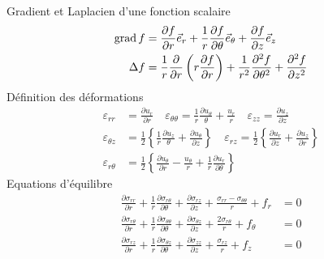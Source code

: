 Gradient et Laplacien d'une fonction scalaire
\begin{align*}
    \operatorname*{\mathrm{grad}} f &= \frac{\partial f}{\partial r} \vec{e}_r + \frac{1}{r} \frac{\partial f}{\partial \theta} \vec{e}_{\theta} + \frac{\partial f}{\partial z} \vec{e}_z \\
    \Delta f &= \frac{1}{r} \frac{\partial}{\partial r} \left( r \frac{\partial f}{\partial r} \right) + \frac{1}{r^{2}}\frac{\partial^2 f}{\partial \theta^2} + \frac{\partial^2 f}{\partial z^2}
\end{align*}
Définition des déformations
\begin{align*}
    \varepsilon_{rr} &= \frac{\partial u_r}{\partial r} \quad \varepsilon_{\theta\theta} = \frac{1}{r} \frac{\partial u_{\theta}}{\theta} + \frac{u_r}{r} \quad \varepsilon_{zz} = \frac{\partial u_z}{\partial z} \\
    \varepsilon_{\theta z} &= \frac{1}{2} \left\{ \frac{1}{r} \frac{\partial u_z}{\theta} + \frac{\partial u_{\theta}}{\partial z} \right\} \quad \varepsilon_{rz} = \frac{1}{2} \left\{ \frac{\partial u_r}{\partial z} + \frac{\partial u_z}{\partial r} \right\} \\
    \varepsilon_{r\theta} &= \frac{1}{2} \left\{ \frac{\partial u_{\theta}}{\partial r} - \frac{u_{\theta}}{r} + \frac{1}{r} \frac{\partial u_r}{\partial \theta} \right\}
\end{align*}
Equations d'équilibre
\begin{align*}
    \frac{\partial \sigma_{rr}}{\partial r} + \frac{1}{r} \frac{\partial \sigma_{r\theta}}{\partial \theta} + \frac{\partial \sigma_{rz}}{\partial z} + \frac{\sigma_{rr} - \sigma_{\theta\theta}}{r} + f_r &=0\\
    \frac{\partial \sigma_{r\theta}}{\partial r} + \frac{1}{r} \frac{\partial \sigma_{\theta\theta}}{\partial \theta} + \frac{\partial \sigma_{\theta z}}{\partial z} + \frac{2\sigma_{r\theta}}{r} + f_{\theta} &=0\\
    \frac{\partial \sigma_{rz}}{\partial r} + \frac{1}{r} \frac{\partial \sigma_{\theta z}}{\partial \theta} + \frac{\partial \sigma_{zz}}{\partial z} + \frac{\sigma_{rz}}{r} + f_z &=0
\end{align*}

